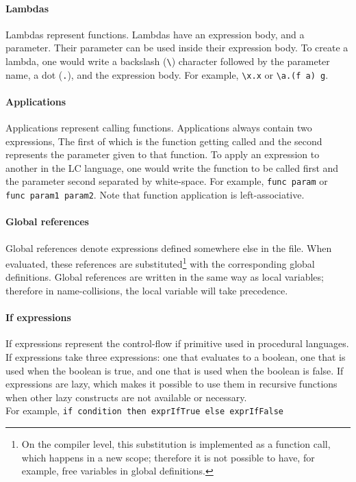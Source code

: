 \documentclass[12pt]{article}
\begin{document}
\paragraph{Lambdas} Lambdas represent functions. Lambdas have an expression
body, and a parameter. Their parameter can be used inside their expression
body. To create a lambda, one would write a backslash (\verb$\$) character
followed by the parameter name, a dot (\verb$.$), and the expression body. For
example, \verb$\x.x$ or \verb$\a.(f a) g$.

\paragraph{Applications} Applications represent calling functions. Applications
always contain two expressions, The first of which is the function getting
called and the second represents the parameter given to that function. To apply
an expression to another in the LC language, one would write the function to be
called first and the parameter second separated by white-space. For example,
\verb$func param$ or \verb$func param1 param2$.
\noindent
Note that function application is left-associative.

\paragraph{Global references} Global references denote expressions defined
somewhere else in the file. When evaluated, these references are
substituted\footnote{On the compiler level, this substitution is implemented as
    a function call, which happens in a new scope; therefore it is not possible
    to have, for example, free variables in global definitions.} with the
corresponding global definitions. Global references are written in the same way
as local variables; therefore in name-collisions, the local variable will take
precedence.

\paragraph{If expressions} If expressions represent the control-flow if
primitive used in procedural languages. If expressions take three expressions:
one that evaluates to a boolean, one that is used when the boolean is true, and
one that is used when the boolean is false. If expressions are lazy, which makes
it possible to use them in recursive functions when other lazy constructs are
not available or necessary. \\
For example, \verb$if condition then exprIfTrue else exprIfFalse$
\end{document}
